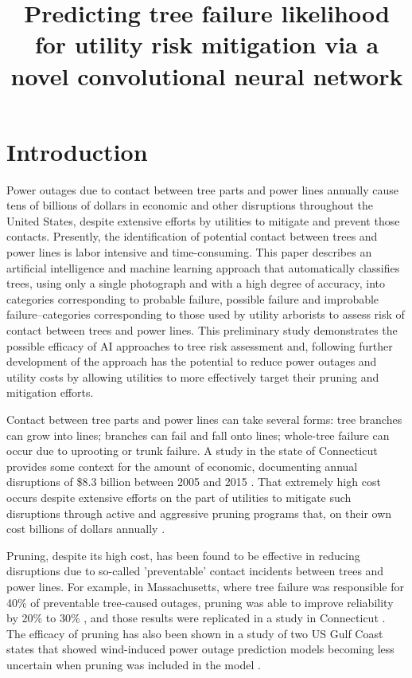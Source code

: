\documentclass[11pt,twoside]{article}
\numberwithin{equation}{section}
\newcommand{\?}{\stackrel{?}{=}}
\begin{document}
\title{Predicting tree failure likelihood for utility risk mitigation via a novel convolutional neural network}
\date{}
\maketitle


\section{Introduction}
Power outages due to contact between tree parts and power lines annually cause tens of billions of dollars in economic and other disruptions throughout the United States, despite extensive efforts by utilities to mitigate and prevent those contacts.  Presently, the identification of potential contact between trees and power lines is labor intensive and time-consuming.  This paper describes an artificial intelligence and machine learning approach that automatically classifies trees, using only a single photograph and with a high degree of accuracy, into categories corresponding to probable failure, possible failure and improbable failure--categories corresponding to those used by utility arborists to assess risk of contact between trees and power lines.  This preliminary study demonstrates the possible efficacy of AI approaches to tree risk assessment and, following further development of the approach has the potential to reduce power outages and utility costs by allowing utilities to more effectively target their pruning and mitigation efforts.  

Contact between tree parts and power lines can take several forms: tree branches can grow into lines; branches can fail and fall onto lines; whole-tree failure can occur due to uprooting or trunk failure.  A study in the state of Connecticut provides some context for the amount of economic, documenting annual disruptions of \$8.3 billion between 2005 and 2015 \cite{graziano2020wider}.  That extremely high cost occurs despite extensive efforts on the part of utilities to mitigate such disruptions through active and aggressive pruning programs that, on their own cost billions of dollars annually \cite{guggenmoos2003effects}.  

Pruning, despite its high cost, has been found to be effective in reducing disruptions due to so-called 'preventable' contact incidents between trees and power lines.  For example, in Massachusetts, where tree failure was responsible for 40\% of preventable tree-caused outages, pruning was able to improve reliability by 20\% to 30\% \cite{simpson1996treecaused}, and those results were replicated in a study in Connecticut \cite{parent2019analysis}. The efficacy of pruning has also been shown in a study of two US Gulf Coast states that showed wind-induced power outage prediction models becoming less uncertain when pruning was included in the model \citet{nateghi2014power}.
\end{document}
